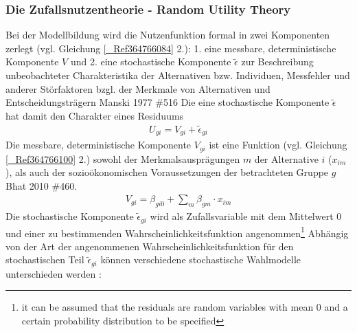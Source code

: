\subsubsection{Die Zufallsnutzentheorie - Random Utility Theory}
\label{_Ref364787213}
\label{_Toc366766081}
\label{_Toc366775275}
Bei der Modellbildung wird die Nutzenfunktion formal in zwei Komponenten zerlegt (vgl. Gleichung \autoref{_Ref364766084} 2.): 1. eine messbare, deterministische Komponente $V$ und 2. eine stochastische Komponente $\widetilde{{\epsilon }}$ zur Beschreibung unbeobachteter Charakteristika der Alternativen bzw. Individuen, Messfehler und anderer Störfaktoren bzgl. der Merkmale von Alternativen und Entscheidungsträgern {Manski 1977 \#516} \autocites[][]{bib.325} \autocites[][]{bib.103} Die eine stochastische Komponente $\widetilde{{\epsilon }}$ hat damit den Charakter eines Residuums  \autocites[][]{bib.268} 
\begin{align}
{{U}_{gi}}={{V}_{gi}}+{{\widetilde{{\epsilon }}}_{gi}} 
\label{_Ref364766084}
\end{align} 
Die messbare, deterministische Komponente ${{V}_{gi}}$ ist eine Funktion (vgl. Gleichung \autoref{_Ref364766100} 2.) sowohl der Merkmalsausprägungen $m$ der Alternative $i$ (${{x}_{im}}$), als auch der sozioökonomischen Voraussetzungen der betrachteten Gruppe $g$  \autocites[][]{bib.103} \autocites[][]{bib.281}{Bhat 2010 \#460}. 
\begin{align}
{{V}_{gi}}={{\beta }_{gi0}}+{\sum_{m}^{}{{{\beta }_{gm}}\cdot {{x}_{im}}}}
\label{_Ref364766100}
\end{align} 
Die stochastische Komponente ${{\widetilde{{\epsilon }}}_{gi}}$ wird als Zufallsvariable mit dem Mittelwert 0 und einer zu bestimmenden Wahrscheinlichkeitsfunktion angenommen\footnote{%
 \glqq [$\ldots$] it can be assumed that the residuals are random variables with mean 0 and a certain probability distribution to be specified\grqq   \autocites[][]{bib.268}
}%
  \autocites[][]{bib.268} Abhängig von der Art der angenommenen Wahrscheinlichkeitsfunktion für den stochastischen Teil ${{\widetilde{{\epsilon }}}_{gi}}$ können verschiedene stochastische Wahlmodelle unterschieden werden  \autocites[][]{bib.103}: ~\\

